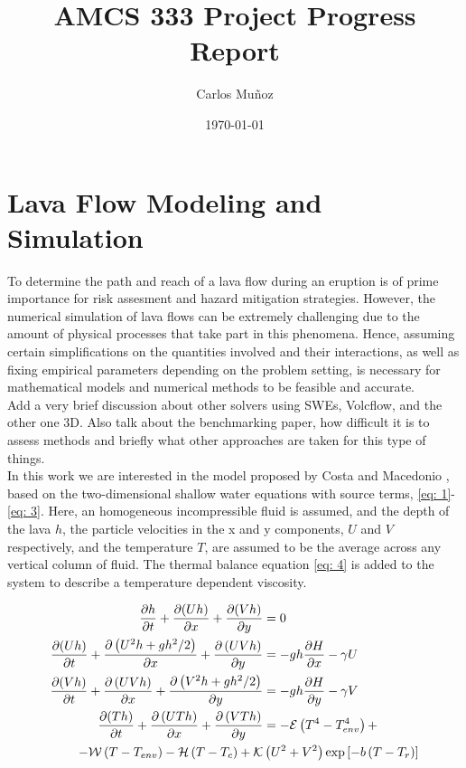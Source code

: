\documentclass[12pt]{article}
\title{AMCS 333 Project Progress Report}
\author{Carlos Muñoz}
\date{\today}
\begin{document}
\maketitle

\section{Lava Flow Modeling and Simulation}

To determine the path and reach of a lava flow during an eruption is of prime importance for risk assesment and hazard mitigation strategies.
However, the numerical simulation of lava flows can be extremely challenging due to the amount of physical processes that take part in this phenomena.
Hence, assuming certain simplifications on the quantities involved and their interactions, as well as fixing empirical parameters depending on the problem setting,  is necessary for  mathematical models and numerical methods to be feasible and accurate.\\

{\color{red}Add a very brief discussion about other solvers using SWEs, Volcflow, and the other one 3D. Also talk about the benchmarking paper, how difficult it is to assess methods and briefly what other approaches are taken for this type of things.}\\

In this work we are interested in the model proposed by Costa and Macedonio \cite{costa2005numerical}, based on the two-dimensional shallow water equations with source terms, \eqref{eq: 1}-\eqref{eq: 3}.
Here, an homogeneous incompressible fluid is assumed, and the depth of the lava $h$, the particle velocities in the x and y components, $U$ and $V$ respectively, and the temperature $T$, are assumed to be the average across any vertical column of fluid. 
The thermal balance equation \eqref{eq: 4} is added to the system to describe a temperature dependent viscosity.


\begin{align}
\frac{\partial h}{\partial t}+\frac{\partial(U h)}{\partial x}+\frac{\partial(V h)}{\partial y}&=0 \label{eq: 1}\\
\frac{\partial(U h)}{\partial t}+\frac{\partial\left( U^{2} h+g h^{2} / 2\right)}{\partial x}+\frac{\partial\left( U V h\right)}{\partial y}&=-g h \frac{\partial H}{\partial x}-\gamma U \label{eq: 2}\\
\frac{\partial(V h)}{\partial t}+\frac{\partial\left( U V h\right)}{\partial x}+\frac{\partial\left( V^{2} h+g h^{2} / 2\right)}{\partial y}&=-g h \frac{\partial H}{\partial y}-\gamma V \label{eq: 3}\\
\frac{\partial(T h)}{\partial t}+\frac{\partial\left( U T h\right)}{\partial x}+\frac{\partial\left( V T h\right)}{\partial y}&=-\mathcal{E}\left(T^{4}-T_{e n v}^{4}\right)+ \label{eq: 4}\\
    \quad-\mathcal{W}\left(T-T_{e n v}\right)-\mathcal{H}\left(T-T_{c}\right)+\mathcal{K}& \left(U^{2}+V^{2}\right) \exp \left[-b\left(T-T_{r}\right)\right] \notag
\end{align}
\end{document}
